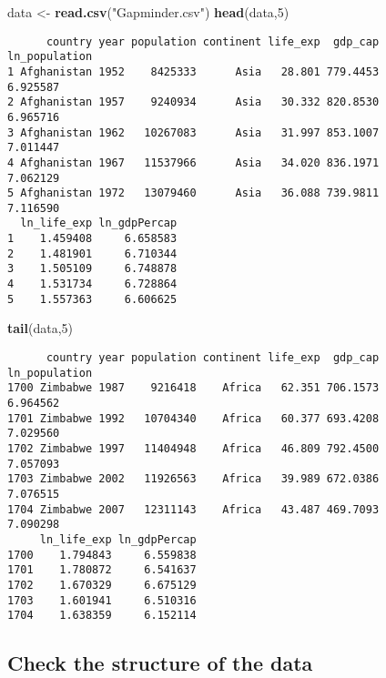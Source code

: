 \documentclass[
]{article}
\newenvironment{Shaded}{\begin{snugshade}}{\end{snugshade}}
\newcommand{\DecValTok}[1]{\textcolor[rgb]{0.00,0.00,0.81}{#1}}
\newcommand{\FunctionTok}[1]{\textcolor[rgb]{0.13,0.29,0.53}{\textbf{#1}}}
\newcommand{\NormalTok}[1]{#1}
\newcommand{\OtherTok}[1]{\textcolor[rgb]{0.56,0.35,0.01}{#1}}
\newcommand{\StringTok}[1]{\textcolor[rgb]{0.31,0.60,0.02}{#1}}
\begin{document}
\begin{Shaded}
\begin{Highlighting}[]
\NormalTok{data }\OtherTok{\textless{}{-}} \FunctionTok{read.csv}\NormalTok{(}\StringTok{"Gapminder.csv"}\NormalTok{)}
\FunctionTok{head}\NormalTok{(data,}\DecValTok{5}\NormalTok{)}
\end{Highlighting}
\end{Shaded}

\begin{verbatim}
      country year population continent life_exp  gdp_cap ln_population
1 Afghanistan 1952    8425333      Asia   28.801 779.4453      6.925587
2 Afghanistan 1957    9240934      Asia   30.332 820.8530      6.965716
3 Afghanistan 1962   10267083      Asia   31.997 853.1007      7.011447
4 Afghanistan 1967   11537966      Asia   34.020 836.1971      7.062129
5 Afghanistan 1972   13079460      Asia   36.088 739.9811      7.116590
  ln_life_exp ln_gdpPercap
1    1.459408     6.658583
2    1.481901     6.710344
3    1.505109     6.748878
4    1.531734     6.728864
5    1.557363     6.606625
\end{verbatim}

\begin{Shaded}
\begin{Highlighting}[]
\FunctionTok{tail}\NormalTok{(data,}\DecValTok{5}\NormalTok{)}
\end{Highlighting}
\end{Shaded}

\begin{verbatim}
      country year population continent life_exp  gdp_cap ln_population
1700 Zimbabwe 1987    9216418    Africa   62.351 706.1573      6.964562
1701 Zimbabwe 1992   10704340    Africa   60.377 693.4208      7.029560
1702 Zimbabwe 1997   11404948    Africa   46.809 792.4500      7.057093
1703 Zimbabwe 2002   11926563    Africa   39.989 672.0386      7.076515
1704 Zimbabwe 2007   12311143    Africa   43.487 469.7093      7.090298
     ln_life_exp ln_gdpPercap
1700    1.794843     6.559838
1701    1.780872     6.541637
1702    1.670329     6.675129
1703    1.601941     6.510316
1704    1.638359     6.152114
\end{verbatim}

\hypertarget{check-the-structure-of-the-data}{%
\subsection{Check the structure of the
data}\label{check-the-structure-of-the-data}}
\end{document}

